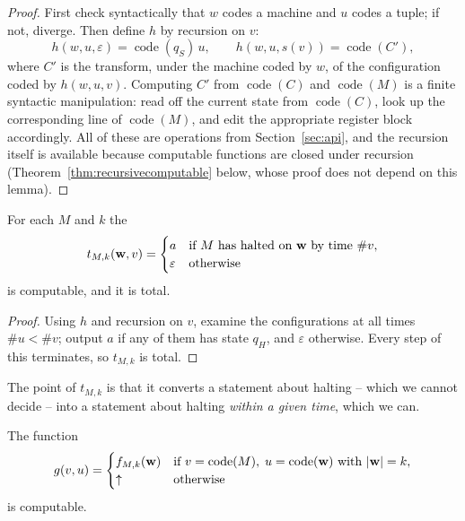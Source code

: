 \documentclass[a4paper]{scrartcl}
\newcommand{\code}{\operatorname{code}}
\newcommand{\eps}{\varepsilon}
\begin{document}
\begin{proof}
	First check syntactically that $w$ codes a machine and $u$ codes a tuple; if not, diverge. Then define $h$ by recursion on $v$:
	$$h(w,u,\eps) = \code(q_S)\,u, \qquad h(w,u,s(v)) = \code(C'),$$
	where $C'$ is the transform, under the machine coded by $w$, of the configuration coded by $h(w,u,v)$. Computing $C'$ from $\code(C)$ and $\code(M)$ is a finite syntactic manipulation: read off the current state from $\code(C)$, look up the corresponding line of $\code(M)$, and edit the appropriate register block accordingly. All of these are operations from Section~\ref{sec:api}, and the recursion itself is available because computable functions are closed under recursion (Theorem~\ref{thm:recursivecomputable} below, whose proof does not depend on this lemma).
\end{proof}

\begin{corollary}\label{cor:truncated}
	For each $M$ and $k$ the 
	$$t_{M,k}(\vv w, v) = \begin{cases} a & \text{if } M \text{ has halted on } \vv w \text{ by time } \#v, \\ \eps & \text{otherwise}\end{cases}$$
	is computable, and it is total.
\end{corollary}

\begin{proof}
	Using $h$ and recursion on $v$, examine the configurations at all times $\#u < \#v$; output $a$ if any of them has state $q_H$, and $\eps$ otherwise. Every step of this terminates, so $t_{M,k}$ is total.
\end{proof}

The point of $t_{M,k}$ is that it converts a statement about halting -- which we cannot decide -- into a statement about halting \emph{within a given time}, which we can.

\begin{theorem}\label{thm:software}
	The function
	$$g(v,u) = \begin{cases} f_{M,k}(\vv w) & \text{if } v = \code(M),\; u = \code(\vv w) \text{ with } \abs{\vv w} = k, \\ \uparrow & \text{otherwise}\end{cases}$$
	is computable.
\end{theorem}
\end{document}
